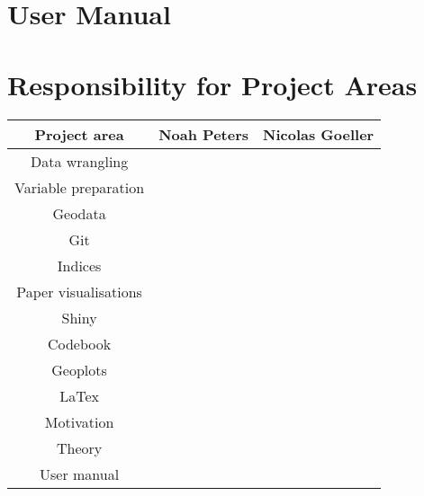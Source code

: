 \documentclass[preprint,12pt,authoryear]{elsarticle}
\begin{document}
\section{User Manual}
	
\section{Responsibility for Project Areas}
	
	\begin{tabular}{|c|c|c|}
		\hline 
		\textbf{Project area}	& \textbf{Noah Peters} 	& \textbf{Nicolas Goeller} 	\\ 
		\hline 
		Data wrangling			&  		   				&  				 			\\ 
		\hline 
		Variable preparation 	&  		   				&  				 			\\ 
		\hline 
		Geodata					&  		   				&  				 			\\ 
		\hline 
		Git	     			 	&  		   				&  				 			\\ 
		\hline 			
		Indices				 	&  		   				&  				 			\\ 
		\hline 
		Paper visualisations 	&  		   				&  				 			\\ 
		\hline 
		Shiny 				 	&  		   				&  				 			\\ 
		\hline 
		Codebook 			 	&  		   				&  				 			\\ 
		\hline 
		Geoplots 			 	&  		   				&  				 			\\ 
		\hline 
		LaTex				 	&  		   				&  				 			\\ 
		\hline 
		Motivation			 	&  		   				&  				 			\\ 
		\hline 
		Theory				 	&  		   				&  				 			\\ 
		\hline 
		User manual			 	&  		   				&  				 			\\ 
		\hline 
	\end{tabular}
	
	
 
	 
	
	
	
\end{document}
